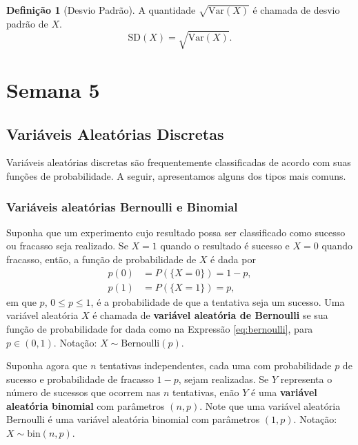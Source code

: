 \documentclass[]{book}
\theoremstyle{definition}
\newtheorem{definition}{Definição}[chapter]
\theoremstyle{definition}
\theoremstyle{definition}
\theoremstyle{remark}
\begin{document}
\begin{definition}[Desvio Padrão]
\protect\hypertarget{def:unnamed-chunk-182}{}{\label{def:unnamed-chunk-182} \iffalse (Desvio Padrão) \fi{} }A quantidade \(\sqrt{\mathrm{Var}(X)}\) é chamada de desvio padrão de \(X\).
\[\mathrm{SD}(X) = \sqrt{\mathrm{Var}(X)}.\]
\end{definition}

\hypertarget{sem5}{%
\chapter{Semana 5}\label{sem5}}

\hypertarget{variuxe1veis-aleatuxf3rias-discretas-1}{%
\section{Variáveis Aleatórias Discretas}\label{variuxe1veis-aleatuxf3rias-discretas-1}}

Variáveis aleatórias discretas são frequentemente classificadas de acordo com suas funções de probabilidade.
A seguir, apresentamos alguns dos tipos mais comuns.

\hypertarget{variuxe1veis-aleatuxf3rias-bernoulli-e-binomial}{%
\subsection{Variáveis aleatórias Bernoulli e Binomial}\label{variuxe1veis-aleatuxf3rias-bernoulli-e-binomial}}

Suponha que um experimento cujo resultado possa ser classificado como sucesso ou fracasso seja realizado.
Se \(X=1\) quando o resultado é sucesso e \(X=0\) quando fracasso, então, a função de probabilidade de \(X\) é dada por
\begin{align}
p(0) &= P(\{X=0\}) = 1-p,\\
p(1) &= P(\{X=1\}) = p,
\label{eq:bernoulli}
\end{align}
em que \(p\), \(0\leq p \leq 1\), é a probabilidade de que a tentativa seja um sucesso.
Uma variável aleatória \(X\) é chamada de \textbf{variável aleatória de Bernoulli} se sua função de probabilidade for dada como na Expressão \eqref{eq:bernoulli}, para \(p \in (0,1)\).
Notação: \(X \sim \mathrm{Bernoulli}(p)\).

Suponha agora que \(n\) tentativas independentes, cada uma com probabilidade \(p\) de sucesso e probabilidade de fracasso \(1-p\), sejam realizadas.
Se \(Y\) representa o número de sucessos que ocorrem nas \(n\) tentativas, enão \(Y\) é uma \textbf{variável aleatória binomial} com parâmetros \((n,p)\).
Note que uma variável aleatória Bernoulli é uma variável aleatória binomial com parâmetros \((1,p)\).
Notação: \(X \sim \mathrm{bin}(n,p)\).
\end{document}
